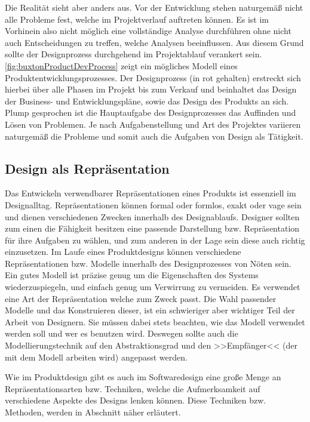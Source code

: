 Die Realität sieht aber anders aus. Vor der Entwicklung stehen naturgemäß nicht alle Probleme fest, welche im Projektverlauf auftreten können. Es ist im Vorhinein also nicht möglich eine vollständige Analyse durchführen ohne nicht auch Entscheidungen zu treffen, welche Analysen beeinflussen. Aus diesem Grund sollte der Designprozess durchgehend im Projektablauf verankert sein.
\autoref{fig:buxtonProductDevProcess} zeigt ein mögliches Modell eines Produktentwicklungsprozesses. Der Designprozess (in rot gehalten) erstreckt sich hierbei über alle Phasen im Projekt bis zum Verkauf und beinhaltet das Design der Business- und Entwicklungspläne, sowie das Design des Produkts an sich. Plump gesprochen ist die Hauptaufgabe des Designprozesses das Auffinden und Lösen von Problemen. Je nach Aufgabenstellung und Art des Projektes variieren naturgemäß die Probleme und somit auch die Aufgaben von Design als Tätigkeit. \citep{Buxton:2007, Sagmeister:2008}

\subsection{Design als Repräsentation} 
Das Entwickeln verwendbarer Repräsentationen eines Produkts ist essenziell im Designalltag. Repräsentationen können formal oder formlos, exakt oder vage sein und dienen verschiedenen Zwecken innerhalb des Designablaufs. Designer sollten zum einen die Fähigkeit besitzen eine passende Darstellung bzw. Repräsentation für ihre Aufgaben zu wählen, und zum anderen in der Lage sein diese auch richtig einzusetzen.
Im Laufe eines Produktdesigns können verschiedene Repräsentationen bzw. Modelle innerhalb des Designprozesses von Nöten sein. Ein gutes Modell ist präzise genug um die Eigenschaften des Systems wiederzuspiegeln, und einfach genug um Verwirrung zu vermeiden. Es verwendet eine Art der Repräsentation welche zum Zweck passt.
Die Wahl passender Modelle und das Konstruieren dieser, ist ein schwieriger aber wichtiger Teil der Arbeit von Designern. Sie müssen dabei stets beachten, wie das Modell verwendet werden soll und wer es benutzen wird. Deswegen sollte auch die Modellierungstechnik auf den Abstraktionsgrad und den >>Empfänger<< (der mit dem Modell arbeiten wird) angepasst werden. \citep{Preece:1994}

\medskip Wie im Produktdesign gibt es auch im Softwaredesign eine große Menge an Repräsentationsarten bzw. Techniken, welche die Aufmerksamkeit auf verschiedene Aspekte des Designs lenken können. Diese Techniken bzw. Methoden, werden in Abschnitt  näher erläutert. 


